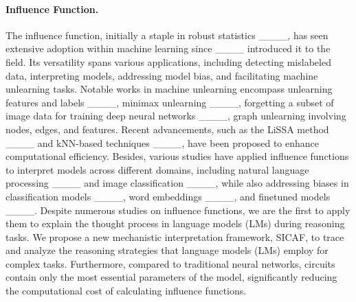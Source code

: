 \paragraph{Influence Function.} The influence function, initially a staple in robust statistics ____, has seen extensive adoption within machine learning since ____ introduced it to the field. Its versatility spans various applications, including detecting mislabeled data, interpreting models, addressing model bias, and facilitating machine unlearning tasks. Notable works in machine unlearning encompass unlearning features and labels ____, minimax unlearning ____, forgetting a subset of image data for training deep neural networks ____, graph unlearning involving nodes, edges, and features. Recent advancements, such as the LiSSA method ____ and kNN-based techniques ____, have been proposed to enhance computational efficiency. Besides, various studies have applied influence functions to interpret models across different domains, including natural language processing ____ and image classification ____, while also addressing biases in classification models ____, word embeddings ____, and finetuned models ____. Despite numerous studies on influence functions, we are the first to apply them to explain the thought process in language models (LMs) during reasoning tasks. We propose a new mechanistic interpretation framework, SICAF, to trace and analyze the reasoning strategies that language models (LMs) employ for complex tasks. Furthermore, compared to traditional neural networks, circuits contain only the most essential parameters of the model, significantly reducing the computational cost of calculating influence functions.